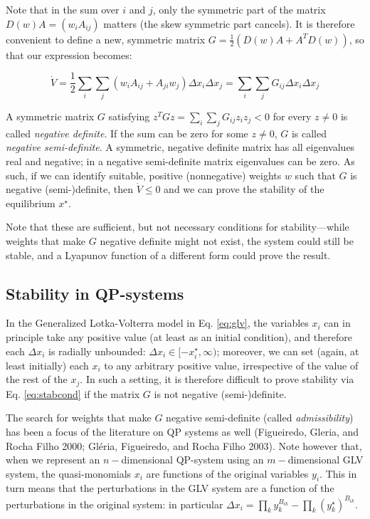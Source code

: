 \documentclass{article}
\begin{document}
Note that in the sum over \(i\) and \(j\), only the symmetric part of
the matrix \(D(w) A = (w_i A_{ij})\) matters (the skew symmetric part
cancels). It is therefore convenient to define a new, symmetric matrix
\(G =\frac{1}{2} (D(w)A + A^T D(w))\), so that our expression becomes:

\begin{equation}
\label{eq:stabcond}
\dot{V} = \frac{1}{2}\sum_i \sum_j (w_i A_{ij} + A_{ji} w_j) \Delta x_i \Delta x_j = \sum_i \sum_j G_{ij} \Delta x_i \Delta x_j
\end{equation}

A symmetric matrix \(G\) satisfying
\(z^T G z = \sum_i \sum_j G_{ij} z_i z_j < 0\) for every \(z \neq 0\) is
called \emph{negative definite}. If the sum can be zero for some
\(z \neq 0\), \(G\) is called \emph{negative semi-definite}. A
symmetric, negative definite matrix has all eigenvalues real and
negative; in a negative semi-definite matrix eigenvalues can be zero. As
such, if we can identify suitable, positive (nonnegative) weights \(w\)
such that \(G\) is negative (semi-)definite, then \(\dot{V} \leq 0\) and
we can prove the stability of the equilibrium \(x^\star\).

Note that these are sufficient, but not necessary conditions for
stability---while weights that make \(G\) negative definite might not
exist, the system could still be stable, and a Lyapunov function of a
different form could prove the result.

\hypertarget{stability-in-qp-systems}{%
\subsection{Stability in QP-systems}\label{stability-in-qp-systems}}

In the Generalized Lotka-Volterra model in Eq. \ref{eq:glv}, the
variables \(x_i\) can in principle take any positive value (at least as
an initial condition), and therefore each \(\Delta x_i\) is radially
unbounded: \(\Delta x_i \in [-x_i^\star, \infty)\); moreover, we can set
(again, at least initially) each \(x_i\) to any arbitrary positive
value, irrespective of the value of the rest of the \(x_j\). In such a
setting, it is therefore difficult to prove stability via Eq.
\ref{eq:stabcond} if the matrix \(G\) is not negative (semi-)definite.

The search for weights that make \(G\) negative semi-definite (called
\emph{admissibility}) has been a focus of the literature on QP systems
as well (Figueiredo, Gleria, and Rocha Filho 2000; Gléria, Figueiredo,
and Rocha Filho 2003). Note however that, when we represent an
\(n-\)dimensional QP-system using an \(m-\)dimensional GLV system, the
quasi-monomials \(x_i\) are functions of the original variables \(y_i\).
This in turn means that the perturbations in the GLV system are a
function of the perturbations in the original system: in particular
\(\Delta x_i = \prod_{k} y_k^{B_{ik}} - \prod_{k} (y_k^\star)^{B_{ik}}\).
\end{document}
